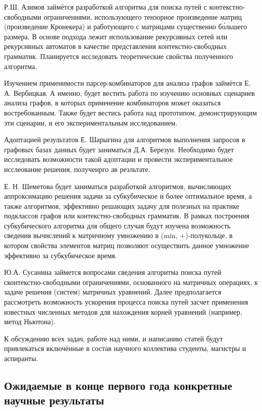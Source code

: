 \documentclass[12pt]{article}  %
\theoremstyle{remark}
\begin{document}
Р.Ш. Азимов займётся разработкой алгоритма для поиска путей с контекстно-свободными ограничениями, использующего тензорное произведение матриц (произведение Кронекера) и работующего с матрицами существенно б\'{о}льшего размера.
В основе подхода лежит использование рекурсивных сетей или рекурсивных автоматов в качестве представления контекстно-свободных грамматик.
Планируется исследовать теоретические свойства полученного алгоритма.

Изучением применимости парсер-комбинаторов для анализа графов займётся Е. А. Вербицкая.
А именно, будет вестить работа по изучению основных сценариев анализа графов, в которых применение комбинаторов может оказаться востребованным.
Также будет вестись работа над прототипом, демонстрирующим эти сценарии, и его экспериментальным исследованием.

Адоптацией результатов Е. Шарыгина для алгоритмов выполнения запросов в графовых базах данных будет заниматься Д.А. Березун.
Необходимо будет исследовать возможности такой адоптации и провести экспериментальное исслеование решения, полученрго ав резльтате.

Е. Н. Шеметова будет заниматься разработкой алгоритмов, вычисляющих аппроксимацию решения задачи за субкубическое и более оптимальное время, а также алгоритмов, эффективно решающих задачу для полезных на практике подклассов графов или контекстно-свободных грамматик. В рамках построения субкубического алгоритма для общего случая будут изучена возможность сведения вычислений к матричному умножению в (min, +)-полукольце, в котором свойства элементов матриц позволяют осуществить данное умножение эффективно за субкубическое время.

Ю.А. Сусанина займется вопросами сведения алгоритма поиска путей сконтекстно-свободными ограничениями, основанного на матричных операциях, к задаче решения (систем) матричных уравнений.
Далее предполагается рассмотреть возможность ускорения процесса поиска путей засчет применения известных численных методов для нахождения корней уравнений (например, метод Ньютона).

К обсуждению всех задач, работе над ними, и написанию статей будут привлекаться включённые в состав научного коллектива студенты, магистры и аспиранты.

\subsection{Ожидаемые в конце первого года конкретные научные результаты}
\end{document}
